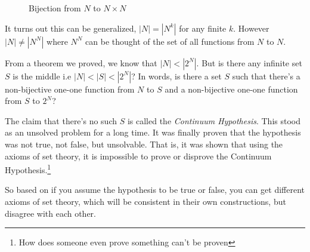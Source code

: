 \documentclass[a4paper,10pt]{article}
\theoremstyle{definition} %
\begin{document}
    \begin{figure}[ht]
    \centering
    \captionsetup{justification=centering}  %
    \caption{Bijection from $N$ to $N \times N$}
    \end{figure}
    
    It turns out this can be generalized, $|N| = |N^k|$ for any finite $k$. However
    $|N| \neq |N^N|$ where $N^N$ can be thought of the set of all functions from $N$
    to $N$.

    From a theorem we proved, we know that $|N| < |2^N|$. But is there any infinite set
    $S$ is the middle i.e $|N| < |S| < |2^N|$? In words, is there a set $S$ such that there's 
    a non-bijective one-one function from $N$ to $S$ and a non-bijective one-one function
    from $S$ to $2^N$?

    The claim that there's no such $S$ is called the \emph{Continuum Hypothesis}. This 
    stood as an unsolved problem for a long time. It was finally proven that the hypothesis 
    was not true, not false, but unsolvable. That is, it was shown that using the axioms of set
    theory, it is impossible to prove or disprove the Continuum Hypothesis.\footnote{
    How does someone even prove something can't be proven
    }

    So based on if you assume the hypothesis to be true or false, you can get different
    axioms of set theory, which will be consistent in their own constructions, but 
    disagree with each other.
\end{document}
